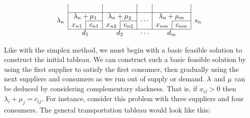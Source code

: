 \[\begin{array}{c|c|c|c|c|c|c|c|c|c}
		                               & \multicolumn{2}{c|}{}                            & \multicolumn{2}{c|}{}                            & \multicolumn{2}{c|}{}                            & \multicolumn{2}{c|}{}                            &                                                                              \\\cline{2-9}
		\multirow{2}{*}{\(\lambda_n\)} & \multicolumn{2}{c|}{\lambda_n + \mu_1}           & \multicolumn{2}{c|}{\lambda_n + \mu_2}           & \multicolumn{2}{c|}{\multirow{2}{*}{\(\cdots\)}} & \multicolumn{2}{c|}{\lambda_n + \mu_m}           & \multirow{2}{*}{\(s_n\)}                                                     \\\cline{3-3}\cline{5-5}\cline{9-9}
		                               & \multicolumn{1}{c|}{x_{n1}}                      & c_{n1}                                           & \multicolumn{1}{c|}{x_{n2}}                      & c_{n2}                                           & \multicolumn{2}{c|}{}               & \multicolumn{1}{c|}{x_{nm}} & c_{nm} & \\\cline{2-9}
		\multicolumn{1}{c}{}           & \multicolumn{2}{c}{d_1}                          & \multicolumn{2}{c}{d_2}                          & \multicolumn{2}{c}{\cdots}                       & \multicolumn{2}{c}{d_m}                          & \multicolumn{1}{c}{}
	\end{array}
\]

\noindent Like with the simplex method, we must begin with a basic feasible solution to construct the initial tableau.
We can construct such a basic feasible solution by using the first supplier to satisfy the first consumer, then gradually using the next suppliers and consumers as we run out of supply or demand.
\( \vb \lambda \) and \( \vb \mu \) can be deduced by considering complementary slackness.
That is, if \( x_{ij} > 0 \) then \( \lambda_i + \mu_j = c_{ij} \).
For instance, consider this problem with three suppliers and four consumers.
The general transportation tableau would look like this:

